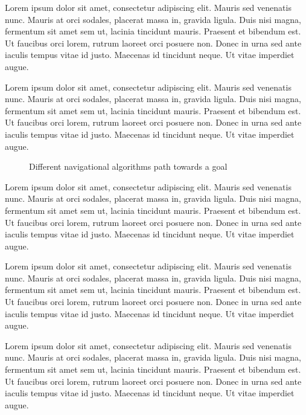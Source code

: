 \documentclass[letterpaper, 10 pt, conference]{ieeeconf}  %
\begin{document}
Lorem ipsum dolor sit amet, consectetur adipiscing elit. Mauris sed venenatis nunc. Mauris at orci sodales, placerat massa in, gravida ligula. Duis nisi magna, fermentum sit amet sem ut, lacinia tincidunt mauris. Praesent et bibendum est. Ut faucibus orci lorem, rutrum laoreet orci posuere non. Donec in urna sed ante iaculis tempus vitae id justo. Maecenas id tincidunt neque. Ut vitae imperdiet augue.

Lorem ipsum dolor sit amet, consectetur adipiscing elit. Mauris sed venenatis nunc. Mauris at orci sodales, placerat massa in, gravida ligula. Duis nisi magna, fermentum sit amet sem ut, lacinia tincidunt mauris. Praesent et bibendum est. Ut faucibus orci lorem, rutrum laoreet orci posuere non. Donec in urna sed ante iaculis tempus vitae id justo. Maecenas id tincidunt neque. Ut vitae imperdiet augue.

\begin{figure}[thpb]
	\centering
	\caption{Different navigational algorithms path towards a goal}
	\label{figurelabel}
\end{figure}


Lorem ipsum dolor sit amet, consectetur adipiscing elit. Mauris sed venenatis nunc. Mauris at orci sodales, placerat massa in, gravida ligula. Duis nisi magna, fermentum sit amet sem ut, lacinia tincidunt mauris. Praesent et bibendum est. Ut faucibus orci lorem, rutrum laoreet orci posuere non. Donec in urna sed ante iaculis tempus vitae id justo. Maecenas id tincidunt neque. Ut vitae imperdiet augue.

Lorem ipsum dolor sit amet, consectetur adipiscing elit. Mauris sed venenatis nunc. Mauris at orci sodales, placerat massa in, gravida ligula. Duis nisi magna, fermentum sit amet sem ut, lacinia tincidunt mauris. Praesent et bibendum est. Ut faucibus orci lorem, rutrum laoreet orci posuere non. Donec in urna sed ante iaculis tempus vitae id justo. Maecenas id tincidunt neque. Ut vitae imperdiet augue.

Lorem ipsum dolor sit amet, consectetur adipiscing elit. Mauris sed venenatis nunc. Mauris at orci sodales, placerat massa in, gravida ligula. Duis nisi magna, fermentum sit amet sem ut, lacinia tincidunt mauris. Praesent et bibendum est. Ut faucibus orci lorem, rutrum laoreet orci posuere non. Donec in urna sed ante iaculis tempus vitae id justo. Maecenas id tincidunt neque. Ut vitae imperdiet augue.
\end{document}
